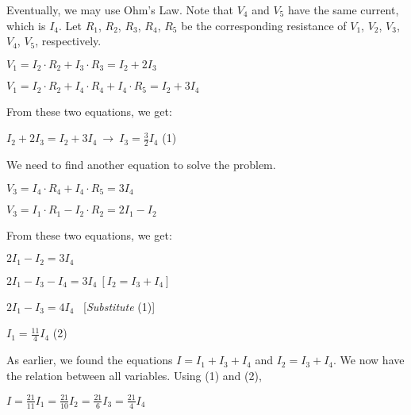 \documentclass{article}
\begin{document}
{\Large Eventually, we may use Ohm's Law. Note that $V_4$ and $V_5$ have the same current, which is $I_4$. Let $R_1$, $R_2$, $R_3$, $R_4$, $R_5$ be the corresponding resistance of $V_1$, $V_2$, $V_3$, $V_4$, $V_5$, respectively.

\vspace{4mm}

{\Large $V_1 = I_2\cdot R_2 + I_3\cdot R_3 = I_2 + 2I_3$}

{\Large $V_1 = I_2\cdot R_2 + I_4 \cdot R_4 + I_4 \cdot R_5 = I_2 + 3I_4$}

\vspace{4mm}

{\Large From these two equations, we get:}

\vspace{4mm}

{\Large $\displaystyle I_2 + 2I_3 = I_2 + 3I_4 \ \rightarrow \ I_3 = \frac{3}{2}I_4$ (1)}

\vspace{4mm}

{\Large We need to find another equation to solve the problem.}

\vspace{4mm}

{\Large $V_3 = I_4\cdot R_4 + I_4\cdot R_5 = 3I_4$}

{\Large $V_3 = I_1\cdot R_1 - I_2\cdot R_2 = 2I_1 - I_2$}

\vspace{4mm}

{\Large From these two equations, we get:}

\vspace{4mm}

{\Large $2I_1 - I_2 = 3I_4$}

{\Large $2I_1 - I_3 - I_4 = 3I_4 \ [I_2 = I_3 + I_4]$}

{\Large $2I_1 - I_3 = 4I_4$ \ [\textit{Substitute} (1)]}

{\Large $\displaystyle I_1 = \frac{11}{4}I_4$ (2)}

\vspace{4mm}

{\Large As earlier, we found the equations $I = I_1 + I_3 + I_4$ and $I_2 = I_3 + I_4$. We now have the relation between all variables. Using (1) and (2),}

\vspace{4mm}

{\Large $\displaystyle I = \frac{21}{11}I_1 = \frac{21}{10}I_2 = \frac{21}{6}I_3 = \frac{21}{4}I_4$}

}
\end{document}
